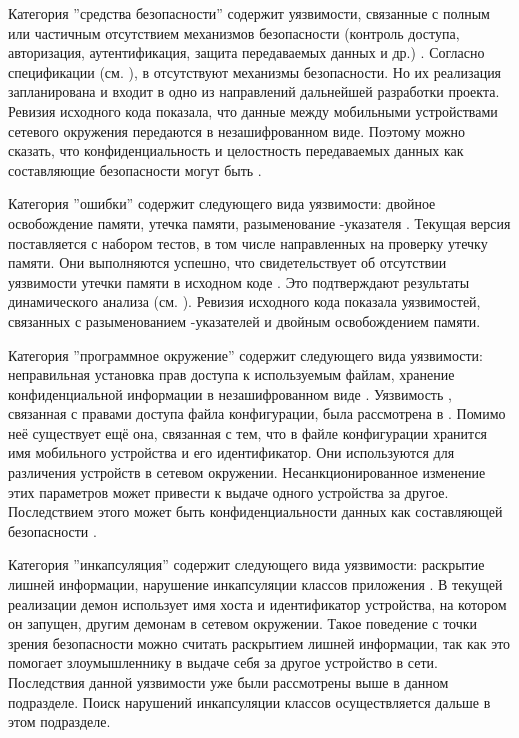 %
Категория ''средства безопасности'' содержит уязвимости, связанные с полным или частичным отсутствием механизмов безопасности (контроль доступа, авторизация, аутентификация, защита передаваемых данных и др.) . 
%
Согласно спецификации (см. ), в  отсутствуют механизмы безопасности. 
%
Но их реализация запланирована и входит в одно из направлений дальнейшей разработки проекта. 
%
Ревизия исходного кода показала, что данные между мобильными устройствами сетевого окружения передаются в незашифрованном виде. 
%
Поэтому можно сказать, что конфиденциальность и целостность передаваемых данных как составляющие безопасности  могут быть . 

%
Категория ''ошибки'' содержит следующего вида уязвимости: двойное освобождение памяти, утечка памяти, разыменование -указателя . 
%
Текущая версия  поставляется с набором тестов, в том числе направленных на проверку утечку памяти. 
%
Они выполняются успешно, что свидетельствует об отсутствии уязвимости утечки памяти в исходном коде . 
%
Это подтверждают результаты динамического анализа (см. ). 
%
Ревизия исходного кода показала  уязвимостей, связанных с разыменованием -указателей и двойным освобождением памяти. 

%
Категория ''программное окружение'' содержит следующего вида уязвимости: неправильная установка прав доступа к используемым файлам, хранение конфиденциальной информации в незашифрованном виде . 
%
Уязвимость , связанная с правами доступа файла конфигурации, была рассмотрена в . 
%
Помимо неё существует ещё она, связанная с тем, что в файле конфигурации хранится имя мобильного устройства и его идентификатор. 
%
Они используются для различения устройств в сетевом окружении. 
%
Несанкционированное изменение этих параметров может привести к выдаче одного устройства за другое. 
%
Последствием этого может быть  конфиденциальности данных как составляющей безопасности . 

%
Категория ''инкапсуляция'' содержит следующего вида уязвимости: раскрытие лишней информации, нарушение инкапсуляции классов приложения . 
%
В текущей реализации  демон использует имя хоста и идентификатор устройства, на котором он запущен, другим демонам в сетевом окружении. 
%
Такое поведение с точки зрения безопасности можно считать раскрытием лишней информации, так как это помогает злоумышленнику в выдаче себя за другое устройство в сети. 
%
Последствия данной уязвимости уже были рассмотрены выше в данном подразделе.
%
Поиск нарушений инкапсуляции классов   осуществляется дальше в этом подразделе. 

